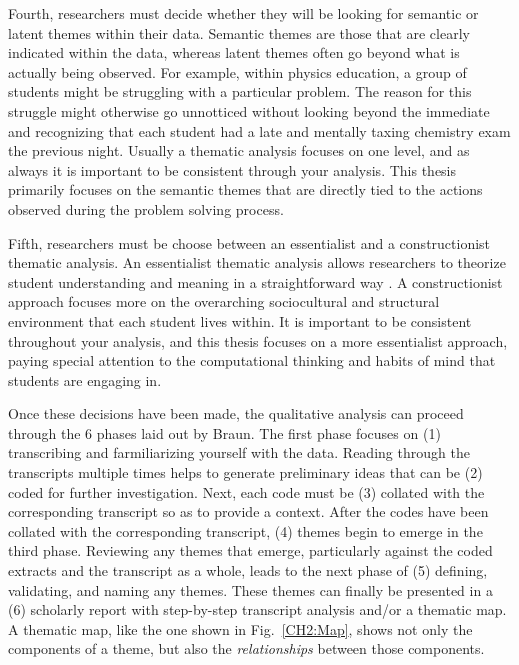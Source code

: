 \documentclass{msuphddissertation}
\begin{document}
\begin{doublespace}
Fourth, researchers must decide whether they will be looking for semantic or latent themes within their data.  Semantic themes are those that are clearly indicated within the data, whereas latent themes often go beyond what is actually being observed.  For example, within physics education, a group of students might be struggling with a particular problem.  The reason for this struggle might otherwise go unnotticed without looking beyond the immediate and recognizing that each student had a late and mentally taxing chemistry exam the previous night.  Usually a thematic analysis focuses on one level, and as always it is important to be consistent through your analysis.  This thesis primarily focuses on the semantic themes that are directly tied to the actions observed during the problem solving process.

Fifth, researchers must be choose between an essentialist and a constructionist thematic analysis.  An essentialist thematic analysis allows researchers to theorize student understanding and meaning in a straightforward way \cite{Potter1997,Widdicombe1995}.  A constructionist approach focuses more on the overarching sociocultural and structural environment that each student lives within.  It is important to be consistent throughout your analysis, and this thesis focuses on a more essentialist approach, paying special attention to the computational thinking and habits of mind that students are engaging in.

Once these decisions have been made, the qualitative analysis can proceed through the $6$ phases laid out by Braun.  The first phase focuses on (1) transcribing and farmiliarizing yourself with the data.  Reading through the transcripts multiple times helps to generate preliminary ideas that can be (2) coded for further investigation.  Next, each code must be (3) collated with the corresponding transcript so as to provide a context.  After the codes have been collated with the corresponding transcript, (4) themes begin to emerge in the third phase.  Reviewing any themes that emerge, particularly against the coded extracts and the transcript as a whole, leads to the next phase of (5) defining, validating, and naming any themes.  These themes can finally be presented in a (6) scholarly report with step-by-step transcript analysis and/or a thematic map.  A thematic map, like the one shown in Fig.~\ref{CH2:Map}, shows not only the components of a theme, but also the \textit{relationships} between those components.


\end{doublespace}
\end{document}
